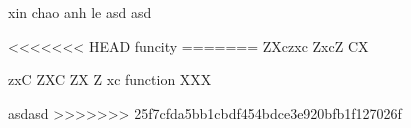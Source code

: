 xin chao anh le
asd
asd

<<<<<<< HEAD
funcity
=======
ZXczxc
ZxcZ
CX

zxC
ZXC
ZX
Z
xc
function XXX

asdasd
>>>>>>> 25f7cfda5bb1cbdf454bdce3e920bfb1f127026f
